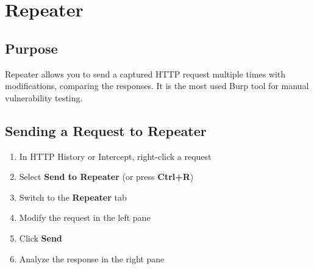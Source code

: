 
\section{Repeater}
\label{sec:repeater}

\subsection{Purpose}

Repeater allows you to send a captured HTTP request multiple times with modifications, comparing the responses. It is the most used Burp tool for manual vulnerability testing.

\subsection{Sending a Request to Repeater}

\begin{enumerate}
  \item In HTTP History or Intercept, right-click a request
  \item Select \textbf{Send to Repeater} (or press \textbf{Ctrl+R})
  \item Switch to the \textbf{Repeater} tab
  \item Modify the request in the left pane
  \item Click \textbf{Send}
  \item Analyze the response in the right pane
\end{enumerate}


